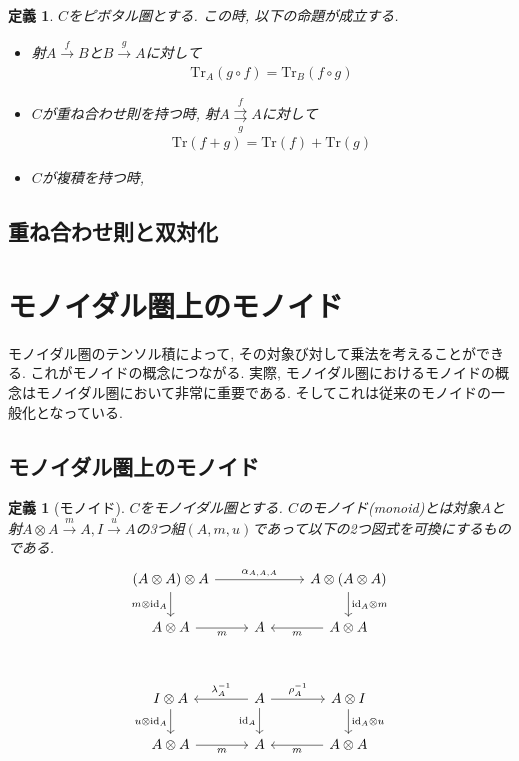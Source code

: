\documentclass[a4paper,12pt]{ltjsarticle}
\theoremstyle{break}
\newtheorem{defn}[thm]{定義}
\newcommand{\xr}[1]{\xrightarrow{#1}}
\newcommand{\id}{\mathrm{id}}
\newcommand{\ci}{\circ}
\newcommand{\al}{\alpha}
\newcommand{\la}{\lambda}
\newcommand{\ot}{\otimes}
\newcommand{\tra}{\mathrm{Tr}}
\numberwithin{equation}{section}
\begin{document}
\begin{defn}
  $C$をピボタル圏とする. 
  この時, 以下の命題が成立する. 
  \begin{itemize}
    \item 射$A \xr{f} B$と$B \xr{g} A$に対して
    \begin{align*}
      \tra_A(g \ci f)=\tra_B(f \ci g)
    \end{align*}
    \item $C$が重ね合わせ則を持つ時, 射$A \overset{f}{\underset{g}{\rightrightarrows}} A$に対して
    \begin{align*}
      \tra(f+g)=\tra(f)+\tra(g)
    \end{align*}
    \item $C$が複積を持つ時, 
  \end{itemize}
\end{defn}

\subsection{重ね合わせ則と双対化}

\newpage

\section{モノイダル圏上のモノイド}

モノイダル圏のテンソル積によって, その対象び対して乗法を考えることができる. 
これがモノイドの概念につながる. 
実際, モノイダル圏におけるモノイドの概念はモノイダル圏において非常に重要である. 
そしてこれは従来のモノイドの一般化となっている. 

\subsection{モノイダル圏上のモノイド}

\begin{defn}[モノイド]
  $C$をモノイダル圏とする. 
  $C$のモノイド(monoid)とは対象$A$と射$A \ot A \xr{m} A, I \xr{u} A$の3つ組$(A,m,u)$であって以下の2つ図式を可換にするものである. 
  \[\begin{tikzcd}
    {(A \ot A) \ot A} && {A \ot (A \ot A)} \\
    {A \ot A} & A & {A \ot A} \\
    \\
    {I \ot A} & A & {A \ot I} \\
    {A \ot A} & A & {A \ot A}
    \arrow["{\id_A \ot m}", from=1-3, to=2-3]
    \arrow["{\al_{A,A,A}}", from=1-1, to=1-3]
    \arrow["{m \ot \id_A}"', from=1-1, to=2-1]
    \arrow["m", from=2-3, to=2-2]
    \arrow["m"', from=2-1, to=2-2]
    \arrow["\id_A"', from=4-2, to=5-2]
    \arrow["{\rho_A^{-1}}", from=4-2, to=4-3]
    \arrow["{\id_A \ot u}", from=4-3, to=5-3]
    \arrow["m", from=5-3, to=5-2]
    \arrow["{\la_A^{-1}}"', from=4-2, to=4-1]
    \arrow["{u \ot \id_A}"', from=4-1, to=5-1]
    \arrow["m"', from=5-1, to=5-2]
  \end{tikzcd}\]
\end{defn}
\end{document}
